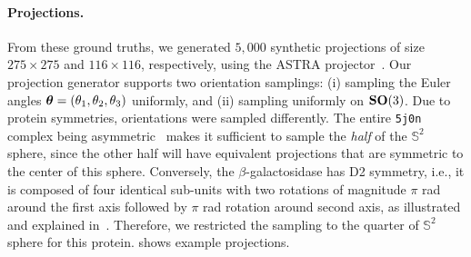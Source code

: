 \paragraph{Projections.}
From these ground truths, we generated $5,000$ synthetic projections of size $275\times 275$ and $116\times 116$, respectively, using the ASTRA projector~\cite{van2015astra}.
Our projection generator supports two orientation samplings: (i) sampling the Euler angles ${\boldsymbol{\theta}}=(\theta_1,\theta_2,\theta_3)$ uniformly, and (ii) sampling uniformly on $\mathrm{\mathbf{SO}}(3)$.
Due to protein symmetries, orientations were sampled differently.
The entire \texttt{5j0n} complex being asymmetric~\cite{doi:10.1002/9780470514160.ch4} makes it sufficient to sample the \textit{half} of the $\mathbb{S}^2$ sphere, since the other half will have equivalent projections that are symmetric to the center of this sphere.
Conversely, the $\beta$-galactosidase has D2 symmetry, i.e., it is composed of four identical sub-units with two rotations of magnitude $\pi$ rad around the first axis followed by $\pi$ rad rotation around second axis, as illustrated and explained in~\cite{symmetry_in_protein,symmetry,scipion-em-github, rcsb-symmetry-view, EmpereurMot2019GeometricDO}.
Therefore, we restricted the sampling to the quarter of $\mathbb{S}^2$ sphere for this protein.
 shows example projections.

